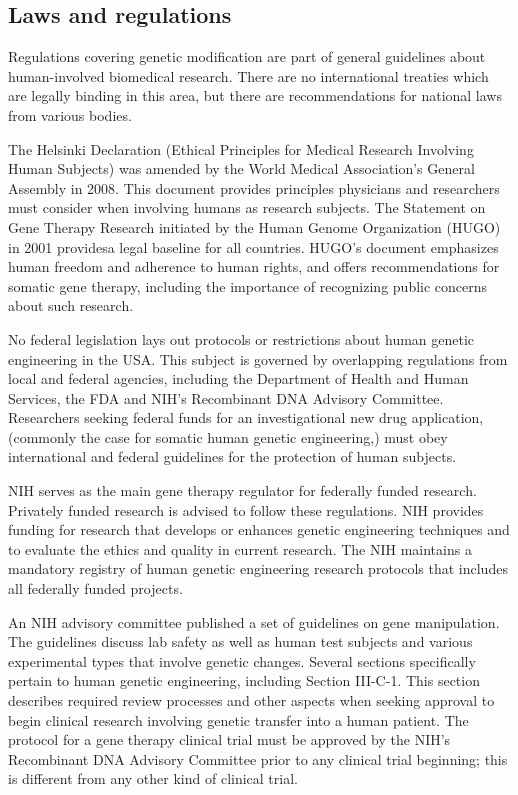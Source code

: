\hypertarget{laws-and-regulations-1}{%
\subsection{Laws and regulations}\label{laws-and-regulations-1}}

Regulations covering genetic modification are part of general guidelines about human-involved biomedical research. There are no international treaties which are legally binding in this area, but there are recommendations for national laws from various bodies.

The Helsinki Declaration (Ethical Principles for Medical Research Involving Human Subjects) was amended by the World Medical Association's General Assembly in 2008. This document provides principles physicians and researchers must consider when involving humans as research subjects. The Statement on Gene Therapy Research initiated by the Human Genome Organization (HUGO) in 2001 providesa legal baseline for all countries. HUGO's document emphasizes human freedom and adherence to human rights, and offers recommendations for somatic gene therapy, including the importance of recognizing public concerns about such research.

No federal legislation lays out protocols or restrictions about human genetic engineering in the USA. This subject is governed by overlapping regulations from local and federal agencies, including the Department of Health and Human Services, the FDA and NIH's Recombinant DNA Advisory Committee. Researchers seeking federal funds for an investigational new drug application, (commonly the case for somatic human genetic engineering,) must obey international and federal guidelines for the protection of human subjects.

NIH serves as the main gene therapy regulator for federally funded research. Privately funded research is advised to follow these regulations. NIH provides funding for research that develops or enhances genetic engineering techniques and to evaluate the ethics and quality in current research. The NIH maintains a mandatory registry of human genetic engineering research protocols that includes all federally funded projects.

An NIH advisory committee published a set of guidelines on gene manipulation. The guidelines discuss lab safety as well as human test subjects and various experimental types that involve genetic changes. Several sections specifically pertain to human genetic engineering, including Section III-C-1. This section describes required review processes and other aspects when seeking approval to begin clinical research involving genetic transfer into a human patient. The protocol for a gene therapy clinical trial must be approved by the NIH's Recombinant DNA Advisory Committee prior to any clinical trial beginning; this is different from any other kind of clinical trial.

